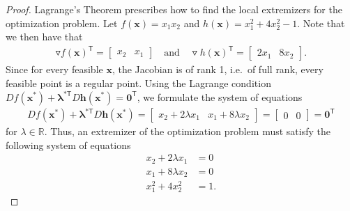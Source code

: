 \documentclass[12pt]{article}
\theoremstyle{definition}
\newcommand{\vc}[1]{\boldsymbol{#1}}
\newcommand{\tran}{\mathsf{T}}
\begin{document}
\begin{proof}
  Lagrange's Theorem prescribes how to find the local extremizers for the optimization problem. Let $f(\vc{x}) = x_1x_2$
  and $h(\vc{x}) = x_1^2 + 4x_2^2 - 1$.
  Note that we then have that
  \begin{align*}
    \triangledown f(\vc{x})^\tran =
    \begin{bmatrix}
      x_2 &
      x_1
    \end{bmatrix}
    \quad \text{and} \quad
    \triangledown h(\vc{x})^\tran =
    \begin{bmatrix}
      2x_1 &
      8x_2
    \end{bmatrix}.
  \end{align*}
  Since for every feasible $\vc{x}$, the Jacobian is of rank 1, i.e.\ of full rank,
  every feasible point is a regular point. Using the Lagrange condition
  $D f(\vc{x}^*) + \vc{\lambda}^{*\tran} D \vc{h}(\vc{x}^*) = \vc{0}^\tran$, we formulate
  the system of equations
  \begin{align*}
    D f(\vc{x}^*) + \vc{\lambda}^{*\tran} D \vc{h}(\vc{x}^*) =
    \begin{bmatrix}x_2 + 2\lambda x_1 & x_1 + 8\lambda x_2\end{bmatrix} =
    \begin{bmatrix}0 & 0\end{bmatrix} = \vc{0}^\tran
  \end{align*}
  for $\lambda \in \mathbb{R}.$
  Thus, an extremizer of the optimization problem must satisfy the following system of equations
  \begin{align*}
    x_2 + 2\lambda x_1 &= 0 \\
    x_1 + 8 \lambda x_2 &= 0 \\
    x_1^2 + 4x_2^2  &=1.
  \end{align*}


\end{proof}
\end{document}
